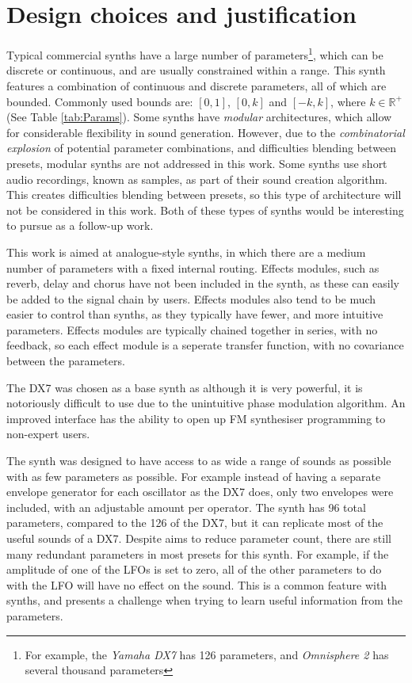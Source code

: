 \documentclass[11pt, oneside]{report}   	%
\begin{document}
\section{Design choices and justification}\label{sec:SynthDescription}
Typical commercial synths have a large number of parameters\footnote{For example, the \emph{Yamaha DX7} has 126 parameters, and  \emph{Omnisphere 2} has several thousand parameters}, which can be discrete or continuous, and are usually constrained within a range. This synth features a combination of continuous and discrete parameters, all of which are bounded. Commonly used bounds are: $[0, 1]$, $[0, k]$ and $[-k, k]$, where $k \in \mathbb{R}^+ $ (See Table \ref{tab:Params}). 
Some synths have \emph{modular} architectures, which allow for considerable flexibility in sound generation. However, due to the \emph{combinatorial explosion} of potential parameter combinations, and difficulties blending between presets, modular synths are not addressed in this work.
Some synths use short audio recordings, known as samples, as part of their sound creation algorithm. This creates difficulties blending between presets, so this type of architecture will not be considered in this work. Both of these types of synths would be interesting to pursue as a follow-up work.

This work is aimed at analogue-style synths, in which there are a medium number of parameters with a fixed internal routing. Effects modules, such as reverb, delay and chorus have not been included in the synth, as these can easily be added to the signal chain by users. Effects modules also tend to be much easier to control than synths, as they typically have fewer, and more intuitive parameters. Effects modules are typically chained together in series, with no feedback, so each effect module is a seperate transfer function, with no covariance between the parameters.


The DX7 was chosen as a base synth as although it is very powerful, it is notoriously difficult to use due to the unintuitive phase modulation algorithm. An improved interface has the ability to open up FM synthesiser programming to non-expert users. %

The synth was designed to have access to as wide a range of sounds as possible with as few parameters as possible. For example instead of having a separate envelope generator for each oscillator as the  DX7 does, only two envelopes were included, with an adjustable amount per operator. The synth has 96 total parameters, compared to the 126 of the DX7, but it can replicate most of the useful sounds of a DX7. Despite aims to reduce parameter count, there are still many redundant parameters in most presets for this synth. For example, if the amplitude of one of the LFOs is set to zero, all of the other parameters to do with the LFO will have no effect on the sound. This is a common feature with synths, and presents a challenge when trying to learn useful information from the parameters.
\end{document}
